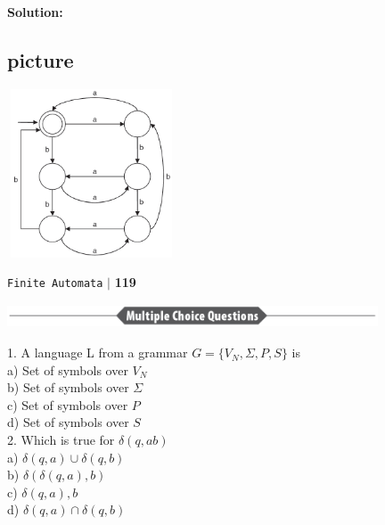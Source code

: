 \textbf{Solution:}\\
\begin{center}
	\section{picture}
	\includegraphics[width=5cm,height=5cm]{./content/chapter03/pictures/118-2.png}
\end{center}

\begin{flushright}
	\texttt{Finite Automata} \hspace*{0.1cm}\textbf{$|$} \hspace*{0.1cm} \textbf{119}\hspace*{0.1cm}
\end{flushright}


\begin{center}
	\includegraphics[width=11cm,height=0.7cm]{./content/chapter03/pictures/119.png}
\end{center}


1. A language L from a grammar $G = \{V_N, \Sigma,P, S\}$ is\\
\hspace*{0.5cm} a) Set of symbols over $V_N$ \\
\hspace*{0.5cm} b) Set of symbols over $\Sigma$ \\
\hspace*{0.5cm} c) Set of symbols over $P$ \\
\hspace*{0.5cm} d) Set of symbols over $S$ \\

\vspace*{0.2cm}
2. Which is true for $\delta(q, ab)$ \\
\hspace*{0.5cm} a) $\delta(q, a) \cup \delta(q, b)$ \\
\hspace*{0.5cm} b) $\delta(\delta(q, a), b)$ \\
\hspace*{0.5cm} c) $\delta(q, a), b$ \\
\hspace*{0.5cm} d) $\delta(q, a) \cap \delta(q, b)$ \\

